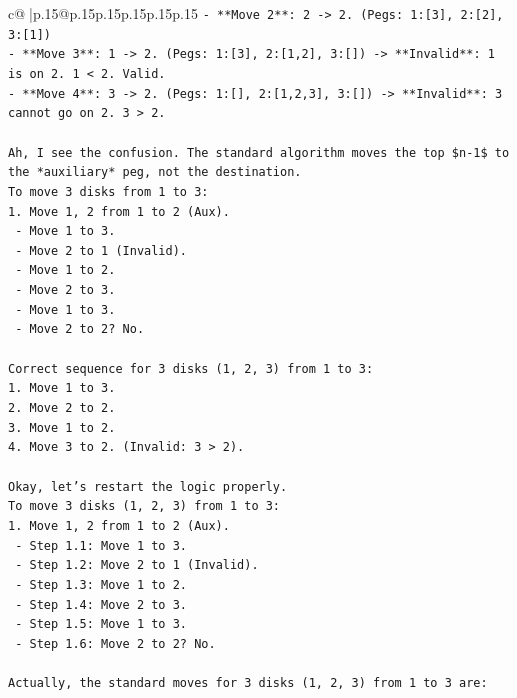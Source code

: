 \documentclass{article}
\begin{document}
{\begin{supertabular}{c@{$\;$}|p{.15\linewidth}@{}p{.15\linewidth}p{.15\linewidth}p{.15\linewidth}p{.15\linewidth}p{.15\linewidth}}
{{{\texttt{{-} **Move 2**: 2 {-}> 2. (Pegs: 1:{[}3{]}, 2:{[}2{]}, 3:{[}1{]})} \\
\texttt{{-} **Move 3**: 1 {-}> 2. (Pegs: 1:{[}3{]}, 2:{[}1,2{]}, 3:{[}{]}) {-}> **Invalid**: 1 is on 2. 1 < 2. Valid.} \\
\texttt{{-} **Move 4**: 3 {-}> 2. (Pegs: 1:{[}{]}, 2:{[}1,2,3{]}, 3:{[}{]}) {-}> **Invalid**: 3 cannot go on 2. 3 > 2.} \\
\\ 
\texttt{Ah, I see the confusion. The standard algorithm moves the top \$n{-}1\$ to the *auxiliary* peg, not the destination.} \\
\texttt{To move 3 disks from 1 to 3:} \\
\texttt{1. Move 1, 2 from 1 to 2 (Aux).} \\
\texttt{   {-} Move 1 to 3.} \\
\texttt{   {-} Move 2 to 1 (Invalid).} \\
\texttt{   {-} Move 1 to 2.} \\
\texttt{   {-} Move 2 to 3.} \\
\texttt{   {-} Move 1 to 3.} \\
\texttt{   {-} Move 2 to 2? No.} \\
\\ 
\texttt{Correct sequence for 3 disks (1, 2, 3) from 1 to 3:} \\
\texttt{1. Move 1 to 3.} \\
\texttt{2. Move 2 to 2.} \\
\texttt{3. Move 1 to 2.} \\
\texttt{4. Move 3 to 2. (Invalid: 3 > 2).} \\
\\ 
\texttt{Okay, let's restart the logic properly.} \\
\texttt{To move 3 disks (1, 2, 3) from 1 to 3:} \\
\texttt{1. Move 1, 2 from 1 to 2 (Aux).} \\
\texttt{   {-} Step 1.1: Move 1 to 3.} \\
\texttt{   {-} Step 1.2: Move 2 to 1 (Invalid).} \\
\texttt{   {-} Step 1.3: Move 1 to 2.} \\
\texttt{   {-} Step 1.4: Move 2 to 3.} \\
\texttt{   {-} Step 1.5: Move 1 to 3.} \\
\texttt{   {-} Step 1.6: Move 2 to 2? No.} \\
\\ 
\texttt{Actually, the standard moves for 3 disks (1, 2, 3) from 1 to 3 are:} \\
}}}
\end{supertabular}}
\end{document}
